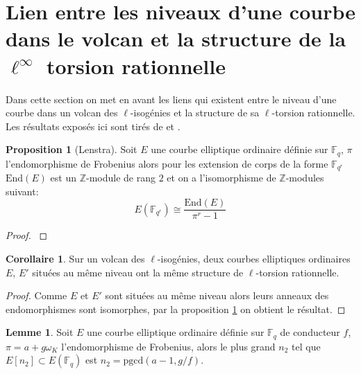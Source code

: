 \documentclass[10pt,a4paper]{book}
\theoremstyle{plain}
\theoremstyle{definition}
\theoremstyle{definition}
\newtheorem{lem}[thm]{Lemme}
\theoremstyle{definition}
\newtheorem{cor}[thm]{Corollaire}
\theoremstyle{definition}
\newtheorem{prop}[thm]{Proposition}
\theoremstyle{definition}
\theoremstyle{remark}
\theoremstyle{remark}
\theoremstyle{definition}
\begin{document}
\section{Lien entre les niveaux d'une courbe dans le volcan et la structure de la $\ell^{\infty}$ torsion rationnelle}
\label{sec:lie:niv}
Dans cette section on met en avant les liens qui existent entre le niveau
d'une courbe dans un volcan des $\ell$-isogénies et la structure de sa 
$\ell$-torsion rationnelle. Les résultats exposés ici sont tirés de 
\cite{MiretMSTV08} et \cite{Ionica-Joux10}.

\begin{prop}[Lenstra]
\label{pro:len:str}
Soit $E$ une courbe elliptique ordinaire définie sur $\mathbb{F}_q$, $\pi$ 
l'endomorphisme de Frobenius alors pour les 
extension de corps de la forme $\mathbb{F}_{q^r}$ $\mathrm{End}(E)$ est un 
$\mathbb{Z}$-module de rang $2$ et on a 
l'isomorphisme de $\mathbb{Z}$-modules suivant:
\[
E(\mathbb{F}_{q^r}) \cong \frac{\mathrm{End}(E)}{\pi^{r}-1}
\] 
\end{prop}  

\begin{proof}
\cite[Theorem 1]{Lenstra96}
\end{proof}

\begin{cor}
Sur un volcan des $\ell$-isogénies, deux courbes elliptiques ordinaires $E$, $E'$ situées au même niveau ont la même structure de $\ell$-torsion rationnelle.
\end{cor}

\begin{proof}
Comme $E$ et $E'$ sont situées au même niveau alors leurs anneaux 
des endomorphismes sont isomorphes, par la proposition \ref{pro:len:str} on 
obtient le résultat.
\end{proof}


\begin{lem}
\label{lem:ruc:rat}
Soit $E$ une courbe elliptique ordinaire définie sur $\mathbb{F}_q$ de 
conducteur $f$, $\pi=a+g \omega_K$ l'endomorphisme de Frobenius, alors le plus 
grand $n_2$ tel que $E[n_2] \subset E(\mathbb{F}_q)$ est $n_2=
\mathrm{pgcd}(a-1,g/f)$.
\end{lem}
\end{document}
